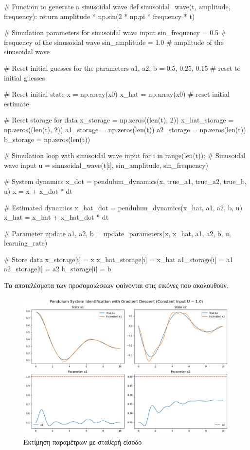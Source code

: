 \documentclass{article}
\begin{document}
\begin{python}
# Function to generate a sinusoidal wave
def sinusoidal_wave(t, amplitude, frequency):
    return amplitude * np.sin(2 * np.pi * frequency * t)

# Simulation parameters for sinusoidal wave input
sin_frequency = 0.5  # frequency of the sinusoidal wave
sin_amplitude = 1.0  # amplitude of the sinusoidal wave

# Reset initial guesses for the parameters
a1, a2, b = 0.5, 0.25, 0.15  # reset to initial guesses

# Reset initial state
x = np.array(x0)
x_hat = np.array(x0)  # reset initial estimate

# Reset storage for data
x_storage = np.zeros((len(t), 2))
x_hat_storage = np.zeros((len(t), 2))
a1_storage = np.zeros(len(t))
a2_storage = np.zeros(len(t))
b_storage = np.zeros(len(t))

# Simulation loop with sinusoidal wave input
for i in range(len(t)):
    # Sinusoidal wave input
    u = sinusoidal_wave(t[i], sin_amplitude, sin_frequency)

    # System dynamics
    x_dot = pendulum_dynamics(x, true_a1, true_a2, true_b, u)
    x = x + x_dot * dt

    # Estimated dynamics
    x_hat_dot = pendulum_dynamics(x_hat, a1, a2, b, u)
    x_hat = x_hat + x_hat_dot * dt

    # Parameter update
    a1, a2, b = update_parameters(x, x_hat, a1, a2, b, u, learning_rate)

    # Store data
    x_storage[i] = x
    x_hat_storage[i] = x_hat
    a1_storage[i] = a1
    a2_storage[i] = a2
    b_storage[i] = b
\end{python}

Τα αποτελέσματα των προσομοιώσεων φαίνονται στις εικόνες που ακολουθούν.

\begin{figure}[h]
    \centering
    \includegraphics[width=\textwidth]{./estimation-const-unit-input.png}
    \caption{Εκτίμηση παραμέτρων με σταθερή είσοδο}
\end{figure}
\end{document}
